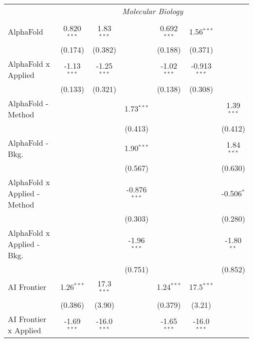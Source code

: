 \begin{tabular}{lcccccc}
 & \multicolumn{6}{c}{\textit{Molecular Biology}} \\ \\
   AlphaFold                      & 0.820$^{***}$  & 1.83$^{***}$  &                & 0.692$^{***}$ & 1.56$^{***}$   &   \\   
                                  & (0.174)        & (0.382)       &                & (0.188)       & (0.371)        &   \\   
   AlphaFold x Applied            & -1.13$^{***}$  & -1.25$^{***}$ &                & -1.02$^{***}$ & -0.913$^{***}$ &   \\   
                                  & (0.133)        & (0.321)       &                & (0.138)       & (0.308)        &   \\   
   AlphaFold - Method             &                &               & 1.73$^{***}$   &               &                & 1.39$^{***}$\\   
                                  &                &               & (0.413)        &               &                & (0.412)\\   
   AlphaFold - Bkg.               &                &               & 1.90$^{***}$   &               &                & 1.84$^{***}$\\   
                                  &                &               & (0.567)        &               &                & (0.630)\\   
   AlphaFold x Applied - Method   &                &               & -0.876$^{***}$ &               &                & -0.506$^{*}$\\   
                                  &                &               & (0.303)        &               &                & (0.280)\\   
   AlphaFold x Applied - Bkg.     &                &               & -1.96$^{***}$  &               &                & -1.80$^{**}$\\   
                                  &                &               & (0.751)        &               &                & (0.852)\\   
   AI Frontier                    & 1.26$^{***}$   & 17.3$^{***}$  &                & 1.24$^{***}$  & 17.5$^{***}$   &   \\   
                                  & (0.386)        & (3.90)        &                & (0.379)       & (3.21)         &   \\   
   AI Frontier x Applied          & -1.69$^{***}$  & -16.0$^{***}$ &                & -1.65$^{***}$ & -16.0$^{***}$  &   \\   

\end{tabular}
